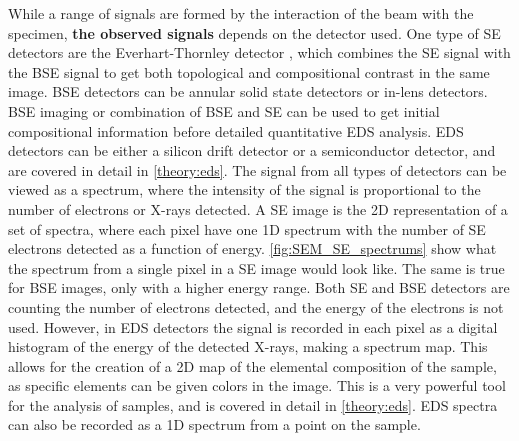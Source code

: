 While a range of signals are formed by the interaction of the beam with the specimen, \textbf{the observed signals} depends on the detector used.
One type of SE detectors are the Everhart-Thornley detector \cite{everhart_detector1960}, which combines the SE signal with the BSE signal to get both topological and compositional contrast in the same image.
BSE detectors can be annular solid state detectors or in-lens detectors.
BSE imaging or combination of BSE and SE can be used to get initial compositional information before detailed quantitative EDS analysis.
EDS detectors can be either a silicon drift detector or a semiconductor detector, and are covered in detail in \cref{theory:eds}.
The signal from all types of detectors can be viewed as a spectrum, where the intensity of the signal is proportional to the number of electrons or X-rays detected.
A SE image is the 2D representation of a set of spectra, where each pixel have one 1D spectrum with the number of SE electrons detected as a function of energy.
\cref{fig:SEM_SE_spectrums} show what the spectrum from a single pixel in a SE image would look like.
The same is true for BSE images, only with a higher energy range.
Both SE and BSE detectors are counting the number of electrons detected, and the energy of the electrons is not used.
However, in EDS detectors the signal is recorded in each pixel as a digital histogram of the energy of the detected X-rays, making a spectrum map.
This allows for the creation of a 2D map of the elemental composition of the sample, as specific elements can be given colors in the image.
This is a very powerful tool for the analysis of samples, and is covered in detail in \cref{theory:eds}.
EDS spectra can also be recorded as a 1D spectrum from a point on the sample.

